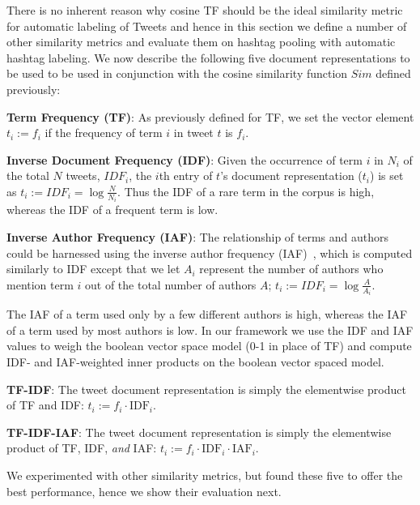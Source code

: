 \documentclass[10pt,a5paper,twoside]{article}
\begin{document}
There is no inherent reason why cosine TF should be the ideal
similarity metric for automatic labeling of Tweets and hence in this
section we define a number of other similarity metrics and 
evaluate them on hashtag pooling with automatic hashtag labeling.
We now describe the following five document representations to be used to
be used in conjunction with the cosine similarity function $\mathit{Sim}$
defined previously:
\begin{description}
\itemsep -2pt
\item{\bf Term Frequency (TF)}: As previously defined for TF, we set the vector element $t_i := f_i$ if the frequency of term $i$ in tweet $t$ is $f_i$.
\item{\bf Inverse Document Frequency (IDF)}:  Given the occurrence of term $i$ in $N_i$ of the total $N$ tweets, $\mathit{IDF}_i$, the $i$th entry of $t$'s document representation ($t_i$) is set as
$t_i := \mathit{IDF}_i = \log{\frac{N}{N_i}}.$
Thus the IDF of a rare term in the corpus is high, whereas the IDF of a frequent term is low. 
\item{\bf Inverse Author Frequency (IAF)}: The relationship of terms and authors could be harnessed using the inverse author frequency (IAF)~\cite{iaf}, which is computed similarly to IDF except that we let $A_i$ represent the number of authors who mention term $i$ out of the total number of authors $A$;
$t_i := \mathit{IDF}_i = \log{\frac{A}{A_i}}.$

The IAF of a term used only by a few different authors is high, whereas the IAF of a term used by most authors is low. In our framework we use the IDF and IAF values to weigh the boolean vector space model (0-1 in place of TF) and compute IDF- and IAF-weighted inner products on the boolean vector spaced model.
\item{\bf TF-IDF}: The tweet document representation is simply the elementwise product of TF and IDF: $t_i := f_i \cdot \mathrm{IDF}_i$.
\item{\bf TF-IDF-IAF}: The tweet document representation is simply the elementwise product of TF, IDF, \emph{and} IAF: $t_i := f_i \cdot \mathrm{IDF}_i \cdot \mathrm{IAF}_i$.
\end{description}
\vspace{-2mm}
We experimented with other similarity metrics, but found these five to
offer the best performance, hence we show their evaluation next.
\end{document}
